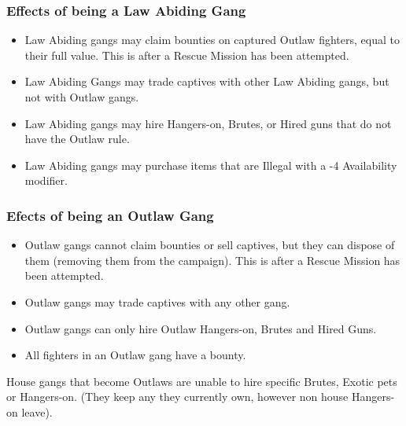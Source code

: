 \documentclass[a4paper]{article}
\begin{document}
	\begin{multicols}{2}
		\subsubsection*{Effects of being a Law Abiding Gang}
		\begin{itemize}
			\item Law Abiding gangs may claim bounties on captured Outlaw fighters, equal to their full value. This is after a Rescue Mission has been attempted.
			\item Law Abiding Gangs may trade captives with other Law Abiding gangs, but not with Outlaw gangs.
			\item Law Abiding gangs may hire Hangers-on, Brutes, or Hired guns that do not have the Outlaw rule.
			\item Law Abiding gangs may purchase items that are Illegal with a -4 Availability modifier.
		\end{itemize}

		\columnbreak

		\subsubsection*{Efects of being an Outlaw Gang}
		\begin{itemize}
			\item Outlaw gangs cannot claim bounties or sell captives, but they can dispose of them (removing them from the campaign). This is after a Rescue Mission has been attempted.
			\item Outlaw gangs may trade captives with any other gang.
			\item Outlaw gangs can only hire Outlaw Hangers-on, Brutes and Hired Guns.
			\item All fighters in an Outlaw gang have a bounty.
		\end{itemize}
	\end{multicols}
	House gangs that become Outlaws are unable to hire specific Brutes, Exotic pets or Hangers-on. (They keep any they currently own, however non house Hangers-on leave).
\end{document}
